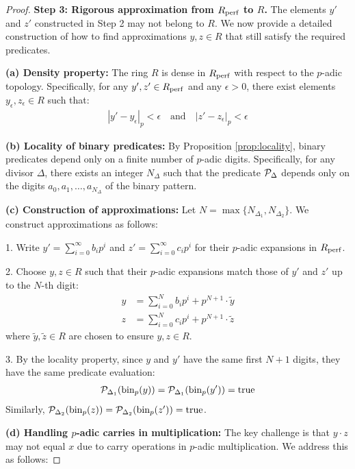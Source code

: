 \begin{proof}
\textbf{Step 3: Rigorous approximation from $R_{\operatorname{perf}}$ to $R$.}
The elements $y'$ and $z'$ constructed in Step 2 may not belong to $R$. We now provide a detailed construction of how to find approximations $y, z \in R$ that still satisfy the required predicates.

\textbf{(a) Density property:} The ring $R$ is dense in $R_{\operatorname{perf}}$ with respect to the $p$-adic topology. Specifically, for any $y', z' \in R_{\operatorname{perf}}$ and any $\epsilon > 0$, there exist elements $y_{\epsilon}, z_{\epsilon} \in R$ such that:
\begin{align*}
|y' - y_{\epsilon}|_p < \epsilon \quad \text{and} \quad |z' - z_{\epsilon}|_p < \epsilon
\end{align*}

\textbf{(b) Locality of binary predicates:} By Proposition \ref{prop:locality}, binary predicates depend only on a finite number of $p$-adic digits. Specifically, for any divisor $\Delta$, there exists an integer $N_{\Delta}$ such that the predicate $\mathcal{P}_{\Delta}$ depends only on the digits $a_0, a_1, \ldots, a_{N_{\Delta}}$ of the binary pattern.

\textbf{(c) Construction of approximations:} Let $N = \max\{N_{\Delta_1}, N_{\Delta_2}\}$. We construct approximations as follows:

1. Write $y' = \sum_{i=0}^{\infty} b_i p^i$ and $z' = \sum_{i=0}^{\infty} c_i p^i$ for their $p$-adic expansions in $R_{\operatorname{perf}}$.

2. Choose $y, z \in R$ such that their $p$-adic expansions match those of $y'$ and $z'$ up to the $N$-th digit:
\begin{align*}
y &= \sum_{i=0}^{N} b_i p^i + p^{N+1} \cdot \tilde{y} \\
z &= \sum_{i=0}^{N} c_i p^i + p^{N+1} \cdot \tilde{z}
\end{align*}
where $\tilde{y}, \tilde{z} \in R$ are chosen to ensure $y, z \in R$.

3. By the locality property, since $y$ and $y'$ have the same first $N+1$ digits, they have the same predicate evaluation:
\begin{align*}
\mathcal{P}_{\Delta_1}(\operatorname{bin}_p(y)) = \mathcal{P}_{\Delta_1}(\operatorname{bin}_p(y')) = \text{true}
\end{align*}
Similarly, $\mathcal{P}_{\Delta_2}(\operatorname{bin}_p(z)) = \mathcal{P}_{\Delta_2}(\operatorname{bin}_p(z')) = \text{true}$.

\textbf{(d) Handling $p$-adic carries in multiplication:} The key challenge is that $y \cdot z$ may not equal $x$ due to carry operations in $p$-adic multiplication. We address this as follows:


\end{proof}
